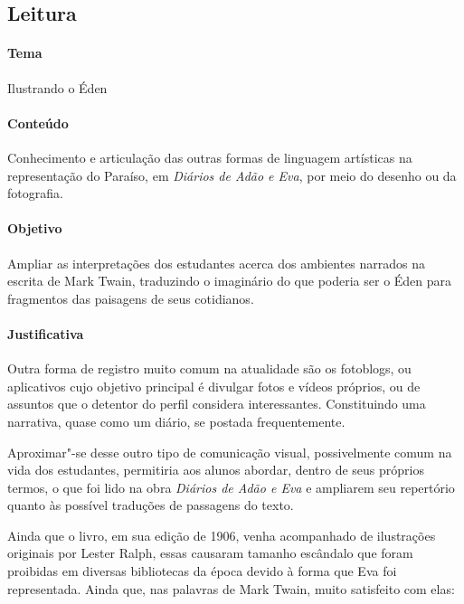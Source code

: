 \documentclass[12pt]{extarticle}
\begin{document}

\subsection{Leitura}

\paragraph{Tema} Ilustrando o Éden 

\paragraph{Conteúdo} Conhecimento e articulação das outras formas de linguagem
artísticas na representação do Paraíso, em \emph{Diários de Adão e Eva}, por meio 
do desenho ou da fotografia.

\paragraph{Objetivo} Ampliar as interpretações dos estudantes acerca dos 
ambientes narrados na escrita 
de Mark Twain, traduzindo o imaginário do que poderia ser o Éden 
para fragmentos das paisagens de seus cotidianos. 

\paragraph{Justificativa} Outra forma de registro muito comum na atualidade são os
fotoblogs, ou aplicativos cujo objetivo principal é divulgar fotos e
vídeos próprios, ou de assuntos que o detentor do perfil considera
interessantes. Constituindo uma narrativa, quase 
como um diário, se postada frequentemente. 

Aproximar"-se desse outro tipo de comunicação visual, 
possivelmente comum na vida dos estudantes, 
permitiria aos alunos abordar, dentro de seus próprios termos, 
o que foi lido na obra \emph{Diários de Adão e Eva} 
e ampliarem seu repertório quanto às possível traduções de passagens do texto.

Ainda que o livro, em sua edição de 1906, venha acompanhado de 
ilustrações originais por Lester Ralph, essas causaram 
tamanho escândalo que foram proibidas em diversas bibliotecas da época devido à forma que Eva foi representada. Ainda que,
nas palavras de Mark Twain, muito satisfeito com elas:
\end{document}
